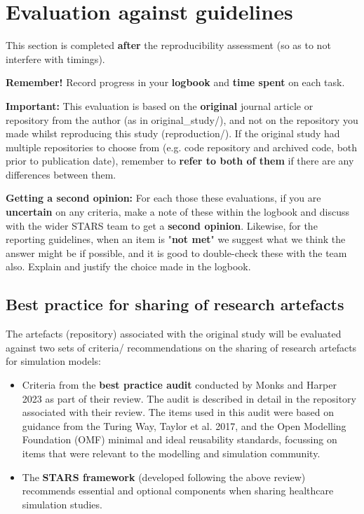 \section{Evaluation against guidelines}

This section is completed \textbf{after} the reproducibility assessment (so as to not interfere with timings).

\textbf{Remember!} Record progress in your \textbf{logbook} and \textbf{time spent} on each task.

\textbf{Important:} This evaluation is based on the \textbf{original} journal article or repository from the author (as in original\_study/), and not on the repository you made whilst reproducing this study (reproduction/). If the original study had multiple repositories to choose from (e.g. code repository and archived code, both prior to publication date), remember to \textbf{refer to both of them} if there are any differences between them.

\textbf{Getting a second opinion:} For each those these evaluations, if you are \textbf{uncertain} on any criteria, make a note of these within the logbook and discuss with the wider STARS team to get a \textbf{second opinion}. Likewise, for the reporting guidelines, when an item is "\textbf{not met}" we suggest what we think the answer might be if possible, and it is good to double-check these with the team also. Explain and justify the choice made in the logbook.

\vspace{0.5cm}
\subsection{Best practice for sharing of research artefacts}

The artefacts (repository) associated with the original study will be evaluated against two sets of criteria/ recommendations on the sharing of research artefacts for simulation models:
\begin{itemize}
    \item Criteria from the \textbf{best practice audit} conducted by Monks and Harper 2023\autocite{monks_computer_2023} as part of their review. The audit is described in detail in the repository associated with their review.\autocite{monks_supplementary_2024} The items used in this audit were based on guidance from the Turing Way,\autocite{the_turing_way_community_turing_2022} Taylor et al. 2017,\autocite{taylor_open_2017} and the Open Modelling Foundation (OMF) minimal and ideal reusability standards,\autocite{the_open_modeling_foundation_omf_reusability_2024} focussing on items that were relevant to the modelling and simulation community.
    \item The \textbf{STARS framework} (developed following the above review) recommends essential and optional components when sharing healthcare simulation studies.
\end{itemize}

